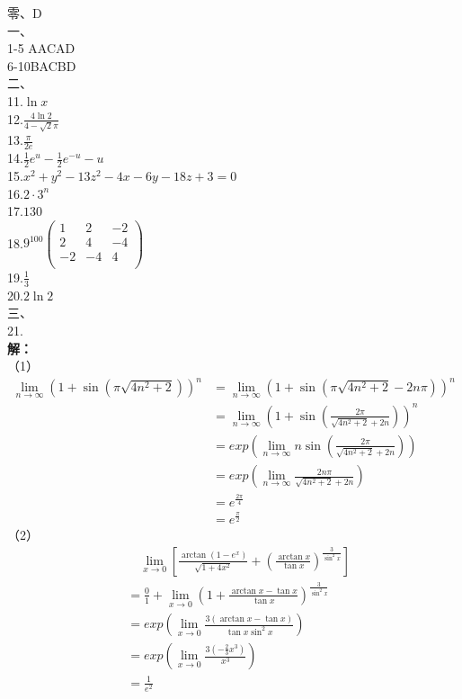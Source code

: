 \documentclass[a4paper]{article}
\begin{document}
\noindent
零、D\\
一、\\
1-5 \quad AACAD\\
6-10\quad BACBD\\
二、\\
11.$\ln x$\\
12.$\frac{4\ln 2}{4-\sqrt{2}\pi}$\\
13.$\frac{\pi}{2e}$\\
14.$\frac{1}{2}e^{u}-\frac{1}{2}e^{-u} -u$\\
15.$x^2+y^2-13z^2-4x-6y-18z+3=0$\\
16.$2\cdot 3^n$\\
17.$130$\\
18.$9^{100}\begin{pmatrix}
    1&2&-2\\
    2&4&-4\\
    -2&-4&4\\
\end{pmatrix}$\\
19.$\frac{1}{3}$\\
20.$2\ln 2$\\
三、\\
21.\\
\textbf{解：}\\
（1）\\
\begin{align*}
	\lim \limits_{n\to\infty} (1+\sin(\pi\sqrt{4n^2+2}))^{n}&=\lim \limits_{n\to\infty} (1+\sin(\pi\sqrt{4n^2+2}-2n\pi))^{n}\\
	&=\lim \limits_{n\to\infty} (1+\sin(\frac{2\pi}{\sqrt{4n^2+2}+2n}))^{n}\\
	&=exp(\lim\limits_{n\to\infty} n\sin(\frac{2\pi}{\sqrt{4n^2+2}+2n}))\\
	&=exp(\lim\limits_{n\to\infty} \frac{2n\pi}{\sqrt{4n^2+2}+2n})\\
	&=e^{\frac{2\pi}{4}}\\
	&=e^{\frac{\pi}{2}}
\end{align*}
（2）\\
\begin{align*}
    &\quad \lim\limits_{x\to 0}\left[\frac{\arctan (1-e^x)}{\sqrt{1+4x^2}}+(\frac{\arctan x}{\tan x})^\frac{3}{\sin^2 x}\right]\\
    &=\frac{0}{1}+ \lim\limits_{x\to 0}(1+\frac{\arctan x-\tan x}{\tan x})^{\frac{3}{\sin^2 x}}\\
    &=exp(\lim\limits_{x\to 0} \frac{3(\arctan x -\tan x)}{\tan x \sin^2 x})\\
    &=exp(\lim\limits_{x\to 0} \frac{3(-\frac{2}{3}x^3)}{x^3})\\
    &=\frac{1}{e^2}
\end{align*}
\end{document}
